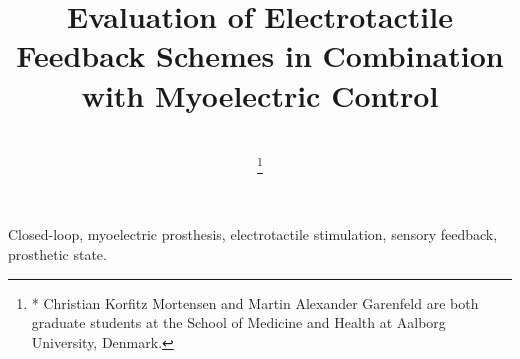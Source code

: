 \documentclass[journal]{IEEEtran}
\begin{document}
\title{Evaluation of Electrotactile Feedback Schemes in Combination with Myoelectric Control\\
}

\author{\\
	\thanks{* Christian Korfitz Mortensen and Martin Alexander Garenfeld are both graduate students at the School of Medicine and Health at Aalborg University, Denmark.}
} 


%
%
%
%

\maketitle

\begin{abstract}

\end{abstract}

\begin{IEEEkeywords}
Closed-loop, myoelectric prosthesis, electrotactile stimulation, sensory feedback, prosthetic state. 
\end{IEEEkeywords}
\end{document}
